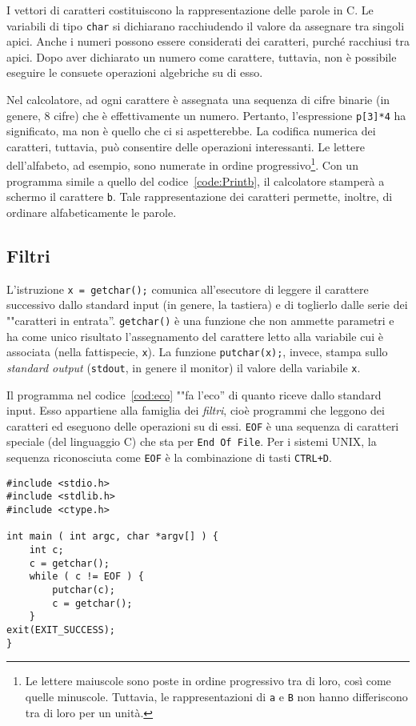 I vettori di caratteri costituiscono la rappresentazione delle parole in C.  Le variabili di tipo \lstinline!char! si dichiarano racchiudendo il valore da assegnare tra singoli apici. Anche i numeri possono essere considerati dei caratteri, purché racchiusi tra apici. Dopo aver dichiarato un numero come carattere, tuttavia, non è possibile eseguire le consuete operazioni algebriche su di esso.

Nel  calcolatore, ad ogni carattere è assegnata una sequenza di cifre binarie (in genere, 8 cifre) che è effettivamente un numero. Pertanto, l'espressione \lstinline!p[3]*4! ha significato, ma non è quello che ci si aspetterebbe. La codifica numerica dei caratteri, tuttavia, può consentire delle operazioni interessanti. Le lettere dell'alfabeto, ad esempio, sono numerate in ordine progressivo\footnote{Le lettere maiuscole sono poste in ordine progressivo tra di loro, così come quelle minuscole. Tuttavia, le rappresentazioni di \lstinline!a! e \lstinline!B! non hanno differiscono tra di loro per un unità.}. Con un programma simile a quello del codice~\vref{code:Printb}, il calcolatore stamperà a schermo il carattere \lstinline!b!. Tale rappresentazione dei caratteri permette, inoltre, di ordinare alfabeticamente le parole.

		\subsection{Filtri}
L'istruzione \lstinline!x = getchar();! comunica all'esecutore di leggere il carattere successivo dallo standard input (in genere, la tastiera) e di toglierlo dalle serie dei ""caratteri in entrata''. \lstinline!getchar()! è una funzione che non ammette parametri e ha come unico risultato l'assegnamento del carattere letto alla variabile cui è associata (nella fattispecie, \lstinline!x!). La funzione \lstinline!putchar(x);!, invece, stampa sullo \emph{standard output} (\lstinline!stdout!, in genere il monitor) il valore della variabile \lstinline!x!.

Il programma nel codice~\vref{cod:eco} ""fa l'eco'' di quanto riceve dallo standard input. Esso appartiene alla famiglia dei \emph{filtri}, cioè programmi che leggono dei caratteri ed eseguono delle operazioni su di essi. \lstinline!EOF! è una sequenza di caratteri speciale (del linguaggio C) che sta per \lstinline!End Of File!. Per i sistemi UNIX, la sequenza riconosciuta come \lstinline!EOF! è la combinazione di tasti \lstinline!CTRL+D!. 
\begin{lstlisting}[caption={\em Esempio di filtro.}, label={cod:eco}]
#include <stdio.h>
#include <stdlib.h>
#include <ctype.h>

int main ( int argc, char *argv[] ) {
	int c;
	c = getchar();
	while ( c != EOF ) {
		putchar(c);
		c = getchar();
	}
exit(EXIT_SUCCESS);
}
\end{lstlisting}